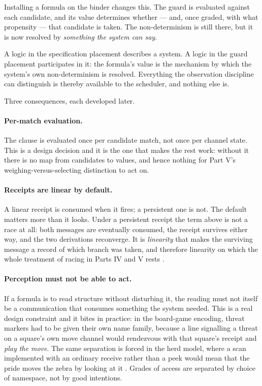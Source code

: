 Installing a formula on the binder changes this. The guard is evaluated against
each candidate, and its value determines whether --- and, once graded, with what
propensity --- that candidate is taken. The non-determinism is still there, but it
is now resolved by \emph{something the system can say}.

\begin{principle}
\label{prin:legible}
A logic in the specification placement describes a system. A logic in the guard
placement participates in it: the formula's value is the mechanism by which the
system's own non-determinism is resolved. Everything the observation discipline
can distinguish is thereby available to the scheduler, and nothing else is.
\end{principle}

Three consequences, each developed later.

\paragraph{Per-match evaluation.} The clause is evaluated once per candidate
match, not once per channel state. This is a design decision and it is the one
that makes the rest work: without it there is no map from candidates to values,
and hence nothing for Part V's weighing-versus-selecting distinction to act on.

\paragraph{Receipts are linear by default.} A linear receipt is consumed when it
fires; a persistent one is not. The default matters more than it looks. Under a
persistent receipt the term above is not a race at all: both messages are
eventually consumed, the receipt survives either way, and the two derivations
reconverge. It is \emph{linearity} that makes the surviving message a record of
which branch was taken, and therefore linearity on which the whole treatment of
racing in Parts IV and V rests \cite{GradedWhere}.

\paragraph{Perception must not be able to act.} If a formula is to read structure
without disturbing it, the reading must not itself be a communication that
consumes something the system needed. This is a real design constraint and it
bites in practice: in the board-game encoding, threat markers had to be given
their own name family, because a line signalling a threat on a square's own move
channel would rendezvous with that square's receipt and \emph{play the move}. The
same separation is forced in the herd model, where a scan implemented with an
ordinary receive rather than a peek would mean that the pride moves the zebra by
looking at it \cite{GameNote,QuorumNote}. Grades of access are separated by choice
of namespace, not by good intentions.


